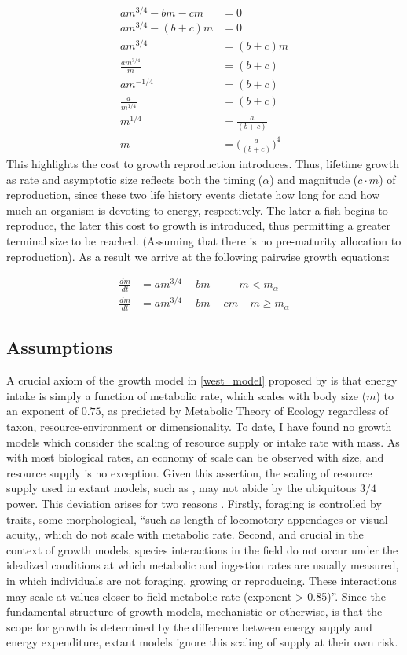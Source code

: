 \documentclass[a4paper]{article} %
\begin{document}
\begin{align*}
    am^{3/4} - bm - cm &= 0 \\
    am^{3/4} - (b+c)m &= 0 \\
    am^{3/4} &= (b+c)m \\
    \frac{am^{3/4}}{m} &= (b+c) \\
    am^{-1/4} &= (b+c) \\
    \frac{a}{m^{1/4}} &= (b+c) \\
    m^{1/4} &= \frac{a}{(b+c)} \\
    m &= \Bigg(\frac{a}{(b+c)}\Bigg)^4
\end{align*}
This highlights the cost to growth reproduction introduces. Thus, lifetime growth as rate and asymptotic size reflects both the timing ($\alpha$) and magnitude ($c\cdot{m}$) of reproduction, since these two life history events dictate how long for and how much an organism is devoting to energy, respectively. The later a fish begins to reproduce, the later this cost to growth is introduced, thus permitting a greater terminal size to be reached. (Assuming that there is no pre-maturity allocation to reproduction). As a result we arrive at the following pairwise growth equations:

\begin{align*}
    \frac{dm}{dt} &= am^{3/4} - bm \ \ \ \ \ \ \ \ \ \ \ \ m < m_{\alpha} \\
    \frac{dm}{dt} &= am^{3/4} - bm - cm \ \ \ \ \ m \geq m_{\alpha}
\end{align*}

\subsection{Assumptions}
A crucial axiom of the growth model in \eqref{west_model} proposed by \cite{West2001} is that energy intake is simply a function of metabolic rate, which scales with body size ($m$) to an exponent of $0.75$, as predicted by Metabolic Theory of Ecology \autocite{Brown2004} regardless of taxon, resource-environment or dimensionality. To date, I have found no growth models which consider the scaling of resource supply or intake rate with mass. As with most biological rates, an economy of scale can be observed with size, and resource supply is no exception. Given this assertion, the scaling of resource supply used in extant models, such as \cite{West2001, Charnov2001}, may not abide by the ubiquitous $3/4$ power. This deviation arises for two reasons \autocite{Pawar2012}. Firstly, foraging is controlled by traits, some morphological, ``such as length of locomotory appendages or visual acuity,, which do not scale with metabolic rate. Second, and crucial in the context of growth models, species interactions in the field do not occur under the idealized conditions at which metabolic and ingestion rates are usually measured, in which individuals are not foraging, growing or reproducing. These interactions may scale at values closer to field metabolic rate (exponent > 0.85)''. Since the fundamental structure of growth models, mechanistic or otherwise, is that the scope for growth is determined by the difference between energy supply and energy expenditure, extant models ignore this scaling of supply at their own risk.
\end{document}
